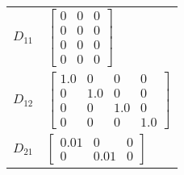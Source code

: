 \begin{tabular}{cl}
 $D_{11}$ & $\left[\begin{matrix}0 & 0 & 0\\0 & 0 & 0\\0 & 0 & 0\\0 & 0 & 0\end{matrix}\right]$                                                                                                                                                                                                                                                                                                                                                                                                                                                                                                                                                                                                                                                                                       \\
 $D_{12}$ & $\left[\begin{matrix}1.0 & 0 & 0 & 0\\0 & 1.0 & 0 & 0\\0 & 0 & 1.0 & 0\\0 & 0 & 0 & 1.0\end{matrix}\right]$                                                                                                                                                                                                                                                                                                                                                                                                                                                                                                                                                                                                                                                               \\
 $D_{21}$ & $\left[\begin{matrix}0.01 & 0 & 0\\0 & 0.01 & 0\end{matrix}\right]$                                                                                                                                                                                                                                                                                                                                                                                                                                                                                                                                                                                                                                                                                                       \\
\hline
\end{tabular}